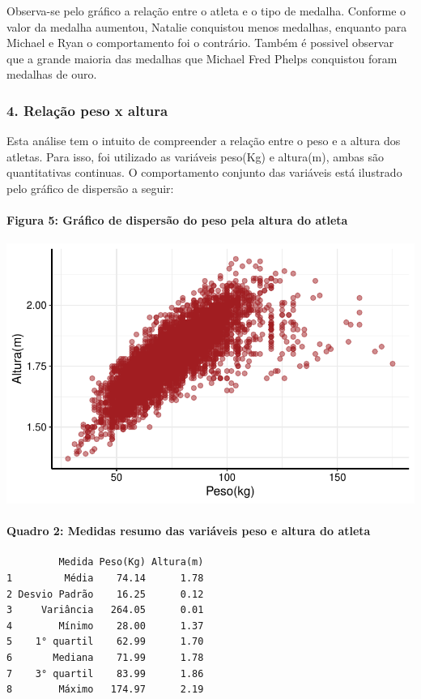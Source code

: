 \documentclass[
  letterpaper,
  DIV=11,
  numbers=noendperiod]{scrartcl}
\let\oldparagraph\paragraph
\renewcommand{\paragraph}[1]{\oldparagraph{#1}\mbox{}}
\begin{document}
Observa-se pelo gráfico a relação entre o atleta e o tipo de medalha.
Conforme o valor da medalha aumentou, Natalie conquistou menos medalhas,
enquanto para Michael e Ryan o comportamento foi o contrário. Também é
possivel observar que a grande maioria das medalhas que Michael Fred
Phelps conquistou foram medalhas de ouro.

\subsubsection{4. Relação peso x
altura}\label{relauxe7uxe3o-peso-x-altura}

Esta análise tem o intuito de compreender a relação entre o peso e a
altura dos atletas. Para isso, foi utilizado as variáveis peso(Kg) e
altura(m), ambas são quantitativas continuas. O comportamento conjunto
das variáveis está ilustrado pelo gráfico de dispersão a seguir:

\paragraph{Figura 5: Gráfico de dispersão do peso pela altura do
atleta}\label{figura-5-gruxe1fico-de-dispersuxe3o-do-peso-pela-altura-do-atleta}

\includegraphics{Relatorio-projeto-fantasma_files/figure-pdf/unnamed-chunk-6-1.pdf}

\paragraph{Quadro 2: Medidas resumo das variáveis peso e altura do
atleta}\label{quadro-2-medidas-resumo-das-variuxe1veis-peso-e-altura-do-atleta}

\begin{verbatim}
         Medida Peso(Kg) Altura(m)
1         Média    74.14      1.78
2 Desvio Padrão    16.25      0.12
3     Variância   264.05      0.01
4        Mínimo    28.00      1.37
5    1° quartil    62.99      1.70
6       Mediana    71.99      1.78
7    3° quartil    83.99      1.86
8        Máximo   174.97      2.19
\end{verbatim}
\end{document}
